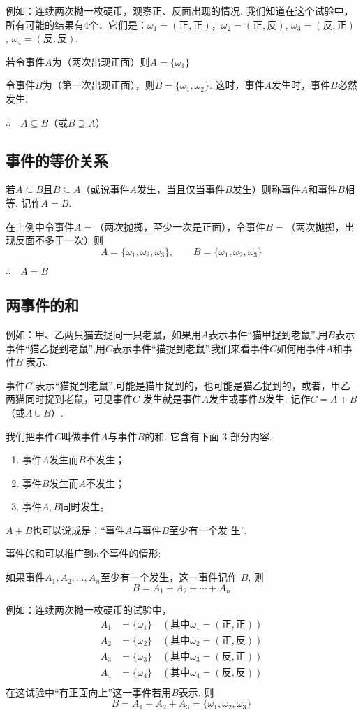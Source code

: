 例如：连续两次抛一枚硬币，观察正、反面出现的情况. 我们知道在这个试验中，所有可能的结果有4个．它们是：$\omega_1=(\text{正}, \text{正})$，$\omega_2=(\text{正}, \text{反})$, $\omega_3=(\text{反}, \text{正})$, $\omega_4=(\text{反}, \text{反})$.

若令事件$A$为（两次出现正面）则$A=\{\omega_1\}$

令事件$B$为（第一次出现正面），则$B=\{\omega_1,\omega_2\}$. 这时，事件$A$发生时，事件$B$必然发生.

$\therefore\quad A\subseteq B$（或$B\supseteq A$）

\subsection{事件的等价关系}
若$A\subseteq B$且$B\subseteq A$（或说事件$A$发生，当且仅当事件$B$发生）则称事件$A$和事件$B$相等. 记作$A=B$.

在上例中令事件$A=$（两次抛掷，至少一次是正面），令事件$B=$（两次抛掷，出现反面不多于一次）则
\[A=\{\omega_1, \omega_2, \omega_3\},\qquad B=\{\omega_1, \omega_2, \omega_3\}\]

$\therefore\quad A=B$

\subsection{两事件的和}

例如：甲、乙两只猫去捉同一只老鼠，如果用$A$表示事件“猫甲捉到老鼠”,用$B$表示事件“猫乙捉到老鼠”,用$C$表示事件“猫捉到老鼠”.我们来看事件$C$如何用事件$A$和事件$B$ 表示.

事件$C$ 表示“猫捉到老鼠”,可能是猫甲捉到的，也可能是猫乙捉到的，或者，甲乙两猫同时捉到老鼠，可见事件$C$ 发生就是事件$A$发生或事件$B$发生. 记作$C=A+B$（或$A\cup B$）.

我们把事件$C$叫做事件$A$与事件$B$的和. 它含有下面 3
部分内容.
\begin{enumerate}[(1)]
\item 事件$A$发生而$B$不发生；
\item 事件$B$发生而$A$不发生；
\item 事件$A,B$同时发生。  
\end{enumerate}

$A+B$也可以说成是：“事件$A$与事件$B$至少有一个发
生”.

事件的和可以推广到$n$个事件的情形:

如果事件$A_1,A_2,\ldots,A_n$至少有一个发生，这一事件记作
$B$, 则
$$B=A_{1}+A_{2}+\cdots+A_{n}$$

例如：连续两次抛一枚硬币的试验中，
\[\begin{split}
    A_{1}&=\{\omega_{1}\}\quad (\text{其中}\omega_1=(\text{正},\text{正}))\\ 
    A_{2}&=\{\omega_{2}\}\quad (\text{其中}\omega_2=(\text{正},\text{反}))\\ 
    A_{3}&=\{\omega_{3}\}\quad (\text{其中}\omega_3=(\text{反},\text{正}))\\ 
    A_{4}&=\{\omega_{4}\}\quad (\text{其中}\omega_4=(\text{反},\text{反}))\\ 
\end{split}\]
在这试验中“有正面向上”这一事件若用$B$表示. 则
$$B=A_{1}+A_{2}+A_{3}=\{\omega_{1},\omega_{2},\omega_{3}\}$$

